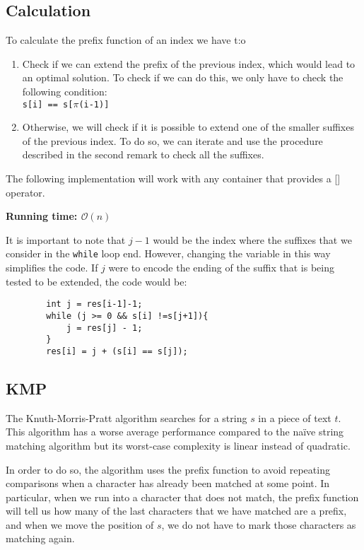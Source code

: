 \subsection{Calculation}
To calculate the prefix function of an index we have t:o
\begin{enumerate}
		\item Check if we can extend the prefix of the previous
				index, which would lead to an optimal solution.
				To check if we can do this, we only have to check
				the following condition: \\ \texttt{s[i] == s[$\pi$(i-1)]}

		\item Otherwise, we will check if it is possible to extend one of 
				the smaller suffixes of the previous index. To do so, we 
				can iterate and use the procedure described in the 
				second remark to check all the suffixes.

\end{enumerate}
The following implementation will work with any container that provides a
[] operator.

\noindent \textbf{\boldmath Running time: $\mathcal{O}(n)$}
\vspace{10pt}

\noindent
It is important to note that $j-1$ would be the 
index where the suffixes that we consider in the \texttt{while} loop end.
However, changing the variable in this way simplifies the code. 
If $j$ were to encode the ending of the suffix that is being tested
to be extended, the code would be: 
\begin{verbatim}
		int j = res[i-1]-1;
		while (j >= 0 && s[i] !=s[j+1]){
			j = res[j] - 1;
		}
		res[i] = j + (s[i] == s[j]);
\end{verbatim}

\newpage
\subsection{KMP}
The Knuth-Morris-Pratt algorithm searches for a string $s$ in a piece of 
text $t$. This algorithm has a worse average performance compared to the
naïve string matching algorithm but its worst-case complexity is linear
instead of quadratic.

In order to do so, the algorithm uses the prefix function to avoid 
repeating comparisons when a character has already been matched at
some point. In particular, when we run into a character that does not
match, the prefix function will tell us how many of the last 
characters that we have matched are a prefix, and when we move
the position of $s$, we do not have to mark those characters 
as matching again.

